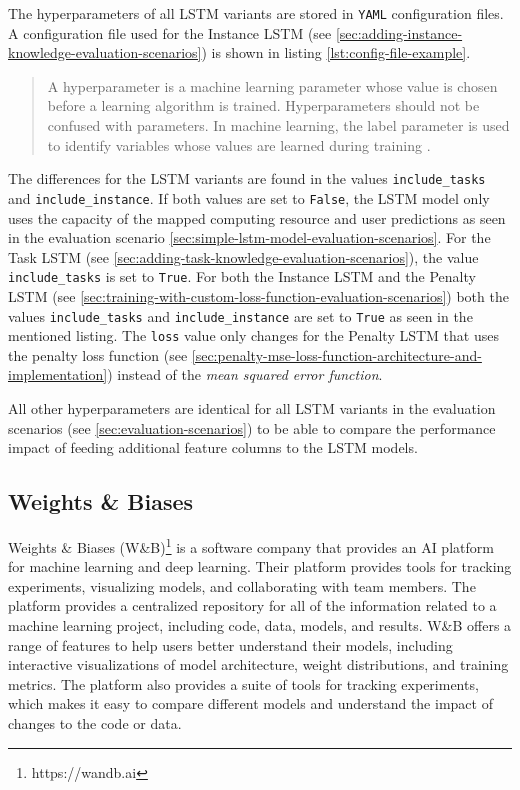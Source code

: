       The hyperparameters of all LSTM variants are stored in \texttt{YAML} configuration files.
      A configuration file used for the Instance LSTM (see \ref{sec:adding-instance-knowledge-evaluation-scenarios}) is shown in listing \ref{lst:config-file-example}.
      \begin{quote}
        A hyperparameter is a machine learning parameter whose value is chosen before a learning algorithm is trained. Hyperparameters should not be confused with parameters. In machine learning, the label parameter is used to identify variables whose values are learned during training \cite{rouseHyperparameter2022}.
      \end{quote}
      The differences for the LSTM variants are found in the values \texttt{include\_tasks} and \texttt{include\_instance}.
      If both values are set to \texttt{False}, the LSTM model only uses the capacity of the mapped computing resource and user predictions as seen in the evaluation scenario \ref{sec:simple-lstm-model-evaluation-scenarios}.
      For the Task LSTM (see \ref{sec:adding-task-knowledge-evaluation-scenarios}), the value \texttt{include\_tasks} is set to \texttt{True}.
      For both the Instance LSTM and the Penalty LSTM (see \ref{sec:training-with-custom-loss-function-evaluation-scenarios}) both the values  \texttt{include\_tasks} and \texttt{include\_instance} are set to \texttt{True} as seen in the mentioned listing.
      The \texttt{loss} value only changes for the Penalty LSTM that uses the penalty loss function (see \ref{sec:penalty-mse-loss-function-architecture-and-implementation}) instead of the \emph{mean squared error function}.

      All other hyperparameters are identical for all LSTM variants in the evaluation scenarios (see \ref{sec:evaluation-scenarios}) to be able to compare the performance impact of feeding additional feature columns to the LSTM models.

      


  \subsection{Weights \& Biases}
  \label{sec:wandb-evaluation-setup}
    
    Weights \& Biases (W\&B)\footnote{https://wandb.ai} is a software company that provides an AI platform for machine learning and deep learning. Their platform provides tools for tracking experiments, visualizing models, and collaborating with team members.
    The platform provides a centralized repository for all of the information related to a machine learning project, including code, data, models, and results.
    W\&B offers a range of features to help users better understand their models, including interactive visualizations of model architecture, weight distributions, and training metrics. The platform also provides a suite of tools for tracking experiments, which makes it easy to compare different models and understand the impact of changes to the code or data.

